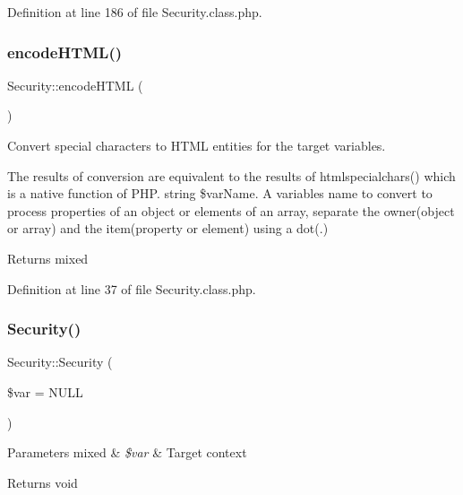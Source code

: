 Definition at line 186 of file Security.\+class.\+php.

\hypertarget{classSecurity_a55da0eb544c3f7eeb6f818578fd0b393}{}\label{classSecurity_a55da0eb544c3f7eeb6f818578fd0b393} 
\subsubsection{\texorpdfstring{encode\+H\+T\+M\+L()}{encodeHTML()}}
{\footnotesize\ttfamily Security\+::encode\+H\+T\+ML (\begin{DoxyParamCaption}{ }\end{DoxyParamCaption})}


\begin{DoxyItemize}
\item Convert special characters to H\+T\+ML entities for the target variables.
\item The results of conversion are equivalent to the results of htmlspecialchars() which is a native function of P\+HP.  string \$var\+Name. A variable\textquotesingle{}s name to convert to process properties of an object or elements of an array, separate the owner(object or array) and the item(property or element) using a dot(.) \begin{DoxyReturn}{Returns}
mixed 
\end{DoxyReturn}

\end{DoxyItemize}

Definition at line 37 of file Security.\+class.\+php.

\hypertarget{classSecurity_ab74d8099e74ecc760f9328fce70760c7}{}\label{classSecurity_ab74d8099e74ecc760f9328fce70760c7} 
\subsubsection{\texorpdfstring{Security()}{Security()}}
{\footnotesize\ttfamily Security\+::\+Security (\begin{DoxyParamCaption}\item[{}]{\$var = {\ttfamily NULL} }\end{DoxyParamCaption})}


\begin{DoxyParams}[1]{Parameters}
mixed & {\em \$var} & Target context \\
\hline
\end{DoxyParams}
\begin{DoxyReturn}{Returns}
void 
\end{DoxyReturn}


